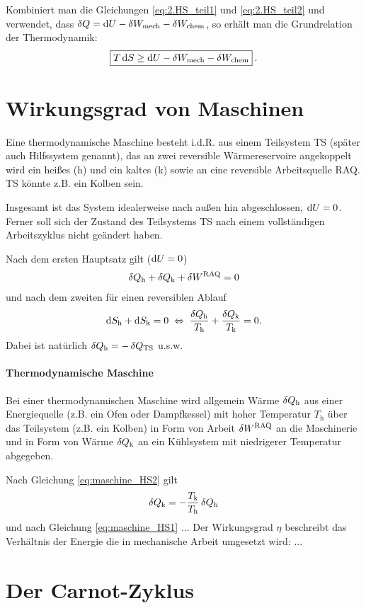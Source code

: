 Kombiniert man die Gleichungen \eqref{eq:2.HS_teil1} und \eqref{eq:2.HS_teil2} und verwendet, dass $\mathop{}\!\delta Q=\mathop{}\!\mathrm{d} U-\mathop{}\!\delta W_\mathrm{mech}-\mathop{}\!\delta W_\mathrm{chem}$, so erhält man die Grundrelation der Thermodynamik:
\begin{align}
    \label{eq:grundrelation_der_TD}
    \boxed{T\mathop{}\!\mathrm{d} S\geq \mathop{}\!\mathrm{d} U-\mathop{}\!\delta W_\mathrm{mech}-\mathop{}\!\delta W_\mathrm{chem}}\:.
\end{align}



\section{Wirkungsgrad von Maschinen}

Eine thermodynamische Maschine besteht i.d.R. aus einem Teilsystem TS (später auch Hilfssystem genannt), das an zwei reversible Wärmereservoire angekoppelt wird \textendash{} ein heißes (h) und ein kaltes (k) \textendash{} sowie an eine reversible Arbeitsquelle RAQ. TS könnte z.B. ein Kolben sein.  

Insgesamt ist das System idealerweise nach außen hin abgeschlossen, $\mathop{}\!\mathrm{d} U=0$. Ferner soll sich der Zustand des Teilsystems TS nach einem vollständigen Arbeitszyklus nicht geändert haben. 

Nach dem ersten Hauptsatz gilt ($\mathop{}\!\mathrm{d} U=0$)
\begin{align}
    \label{eq:maschine_HS1}
    \mathop{}\!\delta Q_\mathrm{h} +\mathop{}\!\delta Q_\mathrm{k} + \mathop{}\!\delta W^\mathrm{RAQ} = 0
\end{align}
und nach dem zweiten für einen reversiblen Ablauf 
\begin{align}
    \label{eq:maschine_HS2}
    \mathop{}\!\mathrm{d} S_\mathrm{h} + \mathop{}\!\mathrm{d} S_\mathrm{k} = 0 \;\Leftrightarrow\; \frac{\mathop{}\!\delta Q_\mathrm{h}}{T_\mathrm{h}} + \frac{\mathop{}\!\delta Q_\mathrm{k}}{T_\mathrm{k}} = 0. 
\end{align}
Dabei ist natürlich $\mathop{}\!\delta Q_\mathrm{h}=-\mathop{}\!\delta Q_\mathrm{TS}$ u.s.w. 

\paragraph*{Thermodynamische Maschine}

Bei einer thermodynamischen Maschine wird allgemein Wärme $\mathop{}\!\delta Q_\mathrm{h}$ aus einer Energiequelle (z.B. ein Ofen oder Dampfkessel) mit hoher Temperatur $T_\mathrm{h}$ über das Teilsystem (z.B. ein Kolben) in Form von Arbeit $\mathop{}\!\delta W^\mathrm{RAQ}$ an die Maschinerie und in Form von Wärme $\mathop{}\!\delta Q_\mathrm{k}$ an ein Kühlsystem mit niedrigerer Temperatur abgegeben. 

Nach Gleichung \eqref{eq:maschine_HS2} gilt 
\begin{align*}
    \mathop{}\!\delta Q_\mathrm{k} = -\frac{T_\mathrm{k}}{T_\mathrm{h}} \mathop{}\!\delta Q_\mathrm{h}
\end{align*}
und nach Gleichung \eqref{eq:maschine_HS1}
...
Der Wirkungsgrad $\eta$ beschreibt das Verhältnis der Energie die in mechanische Arbeit umgesetzt wird:
... 




\section{Der Carnot-Zyklus}
